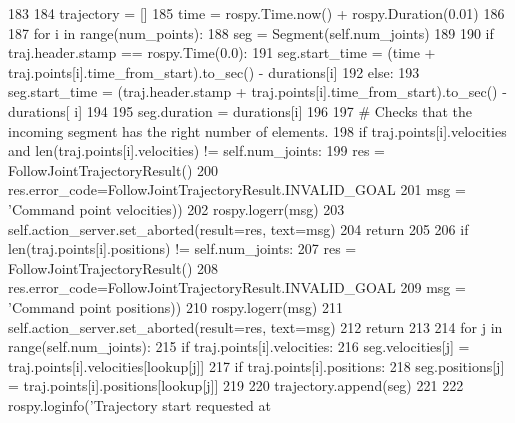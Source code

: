 \begin{DoxyCode}
183             
184         trajectory = []
185         time = rospy.Time.now() + rospy.Duration(0.01)
186         
187         \textcolor{keywordflow}{for} i \textcolor{keywordflow}{in} range(num\_points):
188             seg = Segment(self.num\_joints)
189             
190             \textcolor{keywordflow}{if} traj.header.stamp == rospy.Time(0.0):
191                 seg.start\_time = (time + traj.points[i].time\_from\_start).to\_sec() - durations[i]
192             \textcolor{keywordflow}{else}:
193                 seg.start\_time = (traj.header.stamp + traj.points[i].time\_from\_start).to\_sec() - durations[
      i]
194                 
195             seg.duration = durations[i]
196             
197             \textcolor{comment}{# Checks that the incoming segment has the right number of elements.}
198             \textcolor{keywordflow}{if} traj.points[i].velocities \textcolor{keywordflow}{and} len(traj.points[i].velocities) != self.num\_joints:
199                 res = FollowJointTrajectoryResult()
200                 res.error\_code=FollowJointTrajectoryResult.INVALID\_GOAL
201                 msg = \textcolor{stringliteral}{'Command point %
      velocities))
202                 rospy.logerr(msg)
203                 self.action\_server.set\_aborted(result=res, text=msg)
204                 \textcolor{keywordflow}{return}
205                 
206             \textcolor{keywordflow}{if} len(traj.points[i].positions) != self.num\_joints:
207                 res = FollowJointTrajectoryResult()
208                 res.error\_code=FollowJointTrajectoryResult.INVALID\_GOAL
209                 msg = \textcolor{stringliteral}{'Command point %
      positions))
210                 rospy.logerr(msg)
211                 self.action\_server.set\_aborted(result=res, text=msg)
212                 \textcolor{keywordflow}{return}
213                 
214             \textcolor{keywordflow}{for} j \textcolor{keywordflow}{in} range(self.num\_joints):
215                 \textcolor{keywordflow}{if} traj.points[i].velocities:
216                     seg.velocities[j] = traj.points[i].velocities[lookup[j]]
217                 \textcolor{keywordflow}{if} traj.points[i].positions:
218                     seg.positions[j] = traj.points[i].positions[lookup[j]]
219                     
220             trajectory.append(seg)
221             
222         rospy.loginfo(\textcolor{stringliteral}{'Trajectory start requested at %
}}}
\end{DoxyCode}
